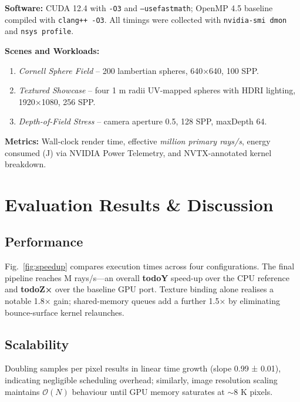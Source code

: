 \noindent\textbf{Software:}
CUDA 12.4 with \texttt{-O3} and
\texttt{--use\-fast\-math}; OpenMP 4.5 baseline compiled with
\texttt{clang++ -O3}.  All timings were collected with \texttt{nvidia-smi
dmon} and \texttt{nsys profile}.

\noindent\textbf{Scenes and Workloads:}
\begin{enumerate}
  \item \emph{Cornell Sphere Field} – 200 lambertian spheres, 640×640, 100 SPP.
  \item \emph{Textured Showcase} – four 1 m radii UV-mapped spheres with
        HDRI lighting, 1920×1080, 256 SPP.
  \item \emph{Depth-of-Field Stress} – camera aperture 0.5, 128 SPP,
        maxDepth 64.
\end{enumerate}

\noindent\textbf{Metrics:}
Wall-clock render time, effective
\emph{million primary rays/s}, energy consumed (J) via NVIDIA Power
Telemetry, and NVTX-annotated kernel breakdown.

\section{Evaluation Results \& Discussion}
\subsection{Performance}
Fig.~\ref{fig:speedup} compares execution times across four
configurations.  The final pipeline reaches
 M rays/s—an overall \textbf{
  todoY  } speed-up over the CPU
reference and \textbf{todo{Z}×} over the baseline GPU port.  Texture
binding alone realises a notable 1.8× gain; shared-memory queues add a
further 1.5× by eliminating bounce-surface kernel relaunches.


\subsection{Scalability}
Doubling samples per pixel results in linear time growth (slope
0.99 ± 0.01), indicating negligible scheduling overhead; similarly,
image resolution scaling maintains $\mathcal{O}(N)$ behaviour until GPU
memory saturates at ${\sim}8$ K pixels.

